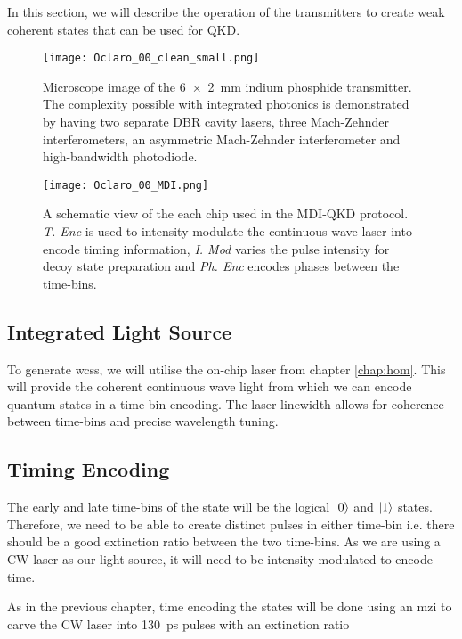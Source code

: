 In this section, we will describe the operation of the transmitters to create weak coherent states that can be used for \acl{QKD}.

\begin{figure}[tbp]
	\centering
	\texttt{[image: Oclaro\_00\_clean\_small.png]}
	\caption[InP transmitter microscope image]{Microscope image of the \SI[product-units=power]{6x2}{mm} indium phosphide transmitter. The complexity possible with integrated photonics is demonstrated by having two separate DBR cavity lasers, three Mach-Zehnder interferometers, an asymmetric  Mach-Zehnder interferometer and high-bandwidth photodiode.}
	\label{fig:oclaro_00}
\end{figure}

\begin{figure}[tbp]
	\texttt{[image: Oclaro\_00\_MDI.png]}
	\caption[InP transmitter schematic]{A schematic view of the each chip used in the MDI-QKD protocol. \textit{T. Enc} is used to intensity modulate the continuous wave laser into encode timing information, \textit{I. Mod} varies the pulse intensity for decoy state preparation and \textit{Ph. Enc} encodes phases between the time-bins.}
	\label{fig:chip_mdi_schematic}
\end{figure}

\subsection{Integrated Light Source}

To generate \acp{wcs}, we will utilise the on-chip laser from chapter \ref{chap:hom}. This will provide the coherent continuous wave light from which we can encode quantum states in a time-bin encoding. The laser linewidth allows for coherence between time-bins and precise wavelength tuning.  

\subsection{Timing Encoding}

The early and late time-bins of the state will be the logical $\ket{0}$ and $\ket{1}$ states. Therefore, we need to be able to create distinct pulses in either time-bin i.e. there should be a good extinction ratio between the two time-bins. As we are using a \ac{CW} laser as our light source, it will need to be intensity modulated to encode time.

As in the previous chapter, time encoding the states will be done using an \acl{mzi} to carve the \ac{CW} laser into \SI{130}{ps} pulses with an extinction ratio

